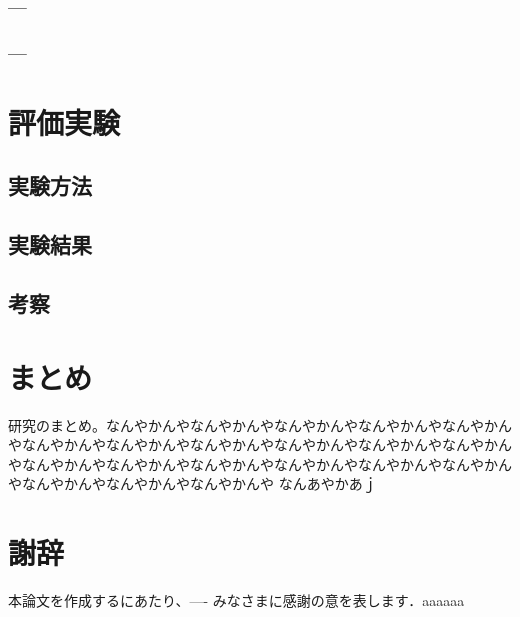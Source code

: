 \documentclass[11pt,a4j]{jreport}
\begin{document}
\subsection{---}
\subsection{---}

\chapter{評価実験}
\section{実験方法}
\section{実験結果}
\section{考察}

\chapter{まとめ}
研究のまとめ。なんやかんやなんやかんやなんやかんやなんやかんやなんやかんやなんやかんやなんやかんやなんやかんやなんやかんやなんやかんやなんやかんやなんやかんやなんやかんやなんやかんやなんやかんやなんやかんやなんやかんやなんやかんやなんやかんやなんやかんや
なんあやかあｊ
\chapter*{謝辞} %
本論文を作成するにあたり、---- みなさまに感謝の意を表します．aaaaaa


\renewcommand{\bibname}{参考文献} %
\end{document}
